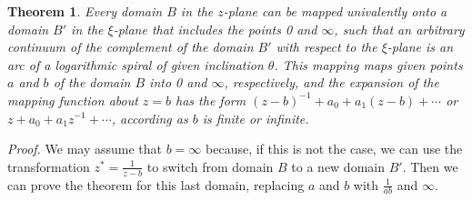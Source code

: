 \documentclass[
]{book}
\newtheorem{theorem}{Theorem}[chapter]
\theoremstyle{definition}
\theoremstyle{definition}
\theoremstyle{definition}
\theoremstyle{definition}
\theoremstyle{remark}
\begin{document}
\begin{theorem}
\protect\hypertarget{thm:unnamed-chunk-71}{}\label{thm:unnamed-chunk-71}Every domain \(B\) in the \(z\)-plane can be mapped univalently onto a domain \(B'\) in the \(\xi\)-plane that includes the points 0 and \(\infty\), such that an arbitrary continuum of the complement of the domain \(B'\) with respect to the \(\xi\)-plane is an arc of a logarithmic spiral of given inclination \(\theta\). This mapping maps given points \(a\) and \(b\) of the domain \(B\) into 0 and \(\infty\), respectively, and the expansion of the mapping function about \(z = b\) has the form \((z - b)^{-1} + a_0 + a_1 (z - b) + \cdots\) or \(z + a_0 + a_1 z^{-1} + \cdots\), according as \(b\) is finite or infinite.
\end{theorem}

\emph{Proof.} We may assume that \(b = \infty\) because, if this is not the case, we can use the transformation \(z^* = \frac{1}{z - b}\) to switch from domain \(B\) to a new domain \(B'\). Then we can prove the theorem for this last domain, replacing \(a\) and \(b\) with \(\frac{1}{ab}\) and \(\infty\).

  
\end{document}
